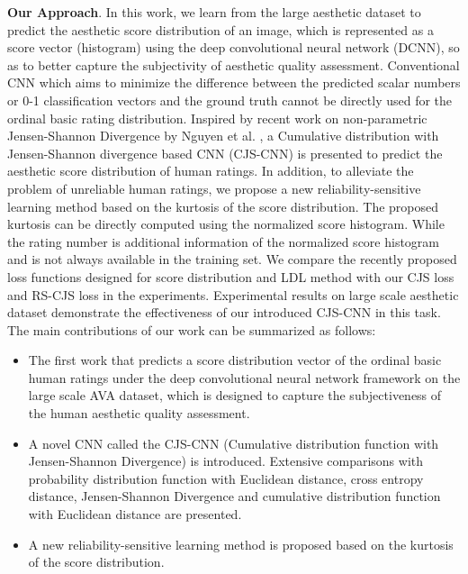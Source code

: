 \documentclass[letterpaper]{article} %
\begin{document}
\textbf{Our Approach}. In this work, we learn from the large aesthetic dataset to predict the aesthetic score distribution of an image, which is represented as a score vector (histogram) using the deep convolutional neural network (DCNN), so as to better capture the subjectivity of aesthetic quality assessment. Conventional CNN which aims to minimize the difference between the predicted scalar numbers or 0-1 classification vectors and the ground truth cannot be directly used for the ordinal basic rating distribution. Inspired by recent work on non-parametric Jensen-Shannon Divergence by Nguyen et al. \cite{NguyenECML2015}, a Cumulative distribution with Jensen-Shannon divergence based CNN (CJS-CNN) is presented to predict the aesthetic score distribution of human ratings. In addition, to alleviate the problem of unreliable human ratings, we propose a new reliability-sensitive learning method based on the kurtosis of the score distribution. The proposed kurtosis can be directly computed using the normalized score histogram. While the rating number is additional information of the normalized score histogram and is not always available in the training set. We compare the recently proposed loss functions designed for score distribution and LDL method with our CJS loss and RS-CJS loss in the experiments. Experimental results on large scale aesthetic dataset demonstrate the effectiveness of our introduced CJS-CNN in this task. The main contributions of our work can be summarized as follows:


\begin{itemize}

\item The first work that predicts a score distribution vector of the ordinal basic human ratings under the deep convolutional neural network framework on the large scale AVA dataset, which is designed to capture the subjectiveness of the human aesthetic quality assessment.

\item A novel CNN called the CJS-CNN (Cumulative distribution function with Jensen-Shannon Divergence) is introduced. Extensive comparisons with probability distribution function with Euclidean distance, cross entropy distance, Jensen-Shannon Divergence and cumulative distribution function with Euclidean distance are presented.

\item A new reliability-sensitive learning method is proposed based on the kurtosis of the score distribution.



\end{itemize}
\end{document}
